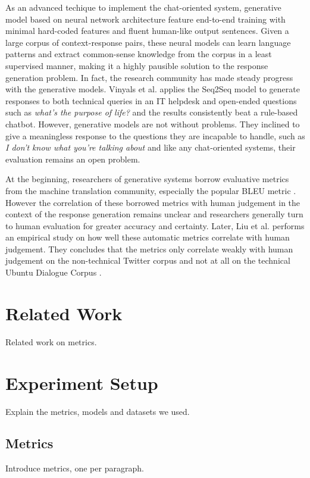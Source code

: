 \documentclass[runningheads]{llncs}
\begin{document}
    As an advanced techique to implement the chat-oriented system, generative model based on neural network architecture feature end-to-end training with minimal hard-coded features and fluent human-like output sentences. Given a large corpus of context-response pairs, these neural models can learn language patterns and extract common-sense knowledge from the corpus in a least supervised manner, making it a highly pausible solution to the response generation problem. In fact, the research community has made steady progress with the generative models. Vinyals et al. \cite{GoogleChatbot} applies the Seq2Seq model to generate responses to both technical queries in an IT helpdesk and open-ended questions such as \textit{what's the purpose of life?} and the results consistently beat a rule-based chatbot. However, generative models are not without problems. They inclined to give a meaningless response to the questions they are incapable to handle, such as \textit{I don't know what you're talking about} and like any chat-oriented systems, their evaluation remains an open problem.

    At the beginning, researchers of generative systems borrow evaluative metrics from the machine translation community, especially the popular BLEU metric \cite{BLEU}. However the correlation of these borrowed metrics with human judgement in the context of the response generation remains unclear and researchers generally turn to human evaluation for greater accuracy and certainty. Later, Liu et al. \cite{HowNot} performs an empirical study on how well these automatic metrics correlate with human judgement. They concludes that the metrics only correlate weakly with human judgement on the non-technical Twitter corpus and not at all on the technical Ubuntu Dialogue Corpus \cite{ubuntu_corpus}.

    \section{Related Work}
    Related work on metrics.

    \section{Experiment Setup}
    Explain the metrics, models and datasets we used.

    \subsection{Metrics}
    Introduce metrics, one per paragraph.
\end{document}
